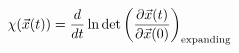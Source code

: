 \begin{equation}
\chi(\vec{x}(t)) = {d\over dt}\ln\det\left( 
{\partial\vec{x}(t) \over \partial\vec x(0)} \right)_{\rm expanding}
\label{eq25}
\end{equation}

